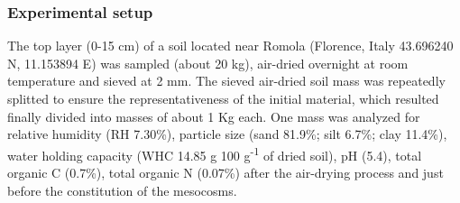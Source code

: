 \subsubsection{Experimental setup}
The top layer (0-15 cm) of a soil located near Romola (Florence, Italy 43.696240 N, 11.153894 E) was sampled (about 20 kg), air-dried overnight at room temperature and sieved at 2 mm. The sieved air-dried soil mass was repeatedly splitted to ensure the representativeness of the initial material, which resulted finally divided into masses of about 1 Kg each. One mass was analyzed for relative humidity (RH 7.30\%), particle size (sand 81.9\%; silt 6.7\%; clay 11.4\%), water holding capacity (WHC 14.85 g 100 g\textsuperscript{-1} of dried soil), pH (5.4), total organic C (0.7\%), total organic N (0.07\%) after the air-drying process and just before the constitution of the mesocosms.\\
